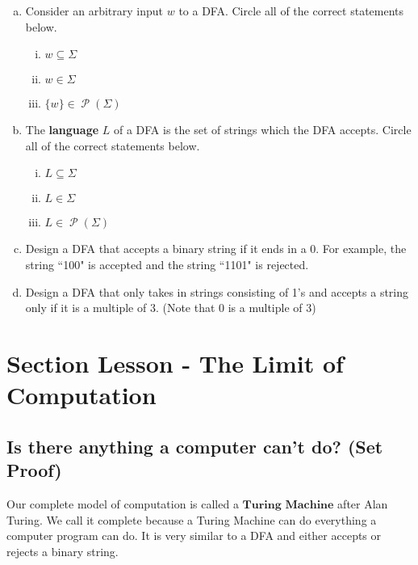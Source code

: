 \documentclass[12pt,letterpaper]{article}
\newcommand\Pow{\ensuremath{\operatorname{\mathcal{P}}}}
\begin{document}
\begin{enumerate}[a.]
	\item Consider an arbitrary input $w$ to a DFA. Circle all of the correct statements below.
	\begin{enumerate}[i.]
		\item $ w \subseteq \Sigma $
		\item $ w \in \Sigma $
		\item $ \{w\} \in \Pow({\Sigma}) $
	\end{enumerate}

	\item The \textbf{language} $L$ of a DFA is the set of strings which the DFA accepts. Circle all of the correct statements below.
	\begin{enumerate}[i.]
		\item $ L \subseteq \Sigma $
		\item $ L \in \Sigma $
		\item $ L \in \Pow({\Sigma}) $
	\end{enumerate}
	
	\item Design a DFA that accepts a binary string if it ends in a 0. For example, the string ``100" is accepted and the string ``1101" is rejected.

	\begin{mdframed}
	\vspace{7cm}
	\end{mdframed}

	\item Design a DFA that only takes in strings consisting of 1's and accepts a string only if it is a multiple of 3. (Note that 0 is a multiple of 3)

	\begin{mdframed}
	\vspace{7cm}
	\end{mdframed}

	\end{enumerate}

	\section*{Section Lesson - The Limit of Computation}

	\subsection*{Is there anything a computer can't do? (Set Proof)}

	Our complete model of computation is called a $\textbf{Turing Machine}$ after Alan Turing. We call it complete because a Turing Machine can do everything a computer program can do. It is very similar to a DFA and either accepts or rejects a binary string. 
\end{document}
